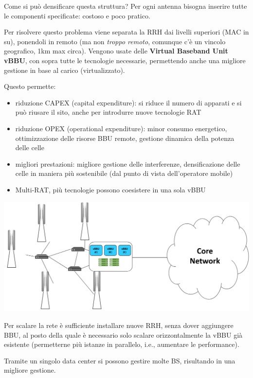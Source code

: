 Come si può densificare questa struttura? Per ogni antenna bisogna inserire tutte le componenti specificate: costoso e poco pratico. 

Per risolvere questo problema viene separata la RRH dai livelli superiori (MAC in su), ponendoli in remoto (ma non \textit{troppo remoto}, comunque c'è un vincolo geografico, 1km max circa). Vengono usate delle \textbf{Virtual Baseband Unit vBBU}, con sopra tutte le tecnologie necessarie, permettendo anche una migliore gestione in base al carico (virtualizzato).

Questo permette:
\begin{itemize}
	\item riduzione CAPEX (capital expenditure): si riduce il numero di apparati e si può riusare il sito, anche per introdurre nuove tecnologie RAT

	\item riduzione OPEX (operational expenditure): minor consumo energetico, ottimizzazione delle risorse BBU remote, gestione dinamica della potenza delle celle

	\item migliori prestazioni: migliore gestione delle interferenze, densificazione delle celle in maniera più sostenibile (dal punto di vista dell'operatore mobile)

	\item Multi-RAT, più tecnologie possono coesistere in una sola vBBU
\end{itemize}
\begin{center}
	\includegraphics[width=0.98\linewidth]{img/5g/vbbu}
\end{center}

Per scalare la rete è sufficiente installare nuove RRH, senza dover aggiungere BBU, al posto della quale è necessario solo scalare orizzontalmente la vBBU già esistente (permetterne più istanze in parallelo, i.e., aumentare le performance). 

Tramite un singolo data center si possono gestire molte BS, risultando in una migliore gestione.

